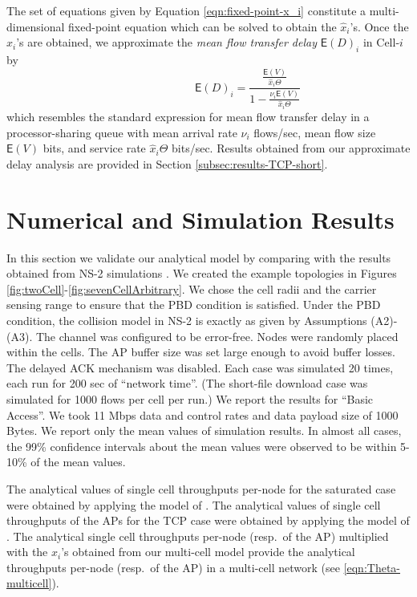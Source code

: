 \documentclass[10pt,a4paper,journal]{IEEEtran}
\theoremstyle{definition}
\theoremstyle{remark}
\theoremstyle{plain}
\newcommand{\EXP}[1]{\mathsf{E}\!\left(#1\right)}
\begin{document}
The set of equations given by Equation \eqref{eqn:fixed-point-x_i} constitute a multi-dimensional fixed-point equation which can be solved to obtain the $\hat{x}_i$'s. Once the $\hat{x}_i$'s are obtained, we approximate the \textit{mean flow transfer delay} $\EXP{D}_i$ in Cell-$i$ by 
\[\quad \quad \quad \quad \quad \quad \quad \EXP{D}_i = \frac{\frac{\EXP{V}}{\hat{x}_i \Theta}}{1 - \frac{\nu_i \EXP{V}}{\hat{x}_i \Theta}}\] 
which resembles the standard expression for mean flow transfer delay in a processor-sharing queue with mean arrival rate $\nu_i$ flows/sec, mean flow size $\EXP{V}$ bits, and service rate $\hat{x}_i \Theta$ bits/sec. Results obtained from our approximate delay analysis are provided in Section \ref{subsec:results-TCP-short}.



\section{Numerical and Simulation Results}
\label{sec:results}

In this section we validate our analytical model by comparing with the results obtained from NS-2 simulations \cite{wanet.ns2}. We created the example topologies in Figures \ref{fig:twoCell}-\ref{fig:sevenCellArbitrary}. We chose the cell radii and the carrier sensing range to ensure that the PBD condition is satisfied. Under the PBD condition, the collision model in NS-2 is exactly as given by Assumptions (A2)-(A3). The channel was configured to be error-free. Nodes were randomly placed within the cells. The AP buffer size was set large enough to avoid buffer losses. The delayed ACK mechanism was disabled. Each case was simulated 20 times, each run for 200 sec of ``network time''. (The short-file download case was simulated for 1000 flows per cell per run.) We report the results for ``Basic Access''. We took 11 Mbps data and control rates and data payload size of 1000 Bytes. We report only the mean values of simulation results. In almost all cases, the 99\% confidence intervals about the mean values were observed to be within 5-10\% of the mean values.








The analytical values of single cell throughputs per-node for the saturated case were obtained by applying the model of \cite{wanet.kumar_etal07new_insights}. The analytical values of single cell throughputs of the APs for the TCP case were obtained by applying the model of \cite{wanet.bruno08TCPeqvSatModel}. The analytical single cell throughputs per-node (resp.~of the AP) multiplied with the $x_i$'s obtained from our multi-cell model provide the analytical throughputs per-node (resp.~of the AP) in a multi-cell network (see \eqref{eqn:Theta-multicell}).
\end{document}
